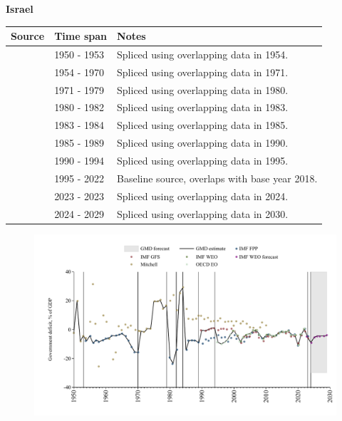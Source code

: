 \documentclass[12pt,a4paper,landscape]{article}
\begin{document}
\begin{adjustbox}{max totalsize={\paperwidth}{\paperheight},center}
\begin{minipage}[t][\textheight][t]{\textwidth}
\vspace*{0.5cm}
{}
\begin{center}
{\Large\bfseries Israel}
\end{center}
\vspace{0.5cm}
\begin{table}[H]
\centering
\small
\begin{tabular}{|l|l|l|}
\hline
\textbf{Source} & \textbf{Time span} & \textbf{Notes} \\
\hline
\rowcolor{white}\cite{Mitchell}& 1950 - 1953 &Spliced using overlapping data in 1954.\\
\rowcolor{lightgray}\cite{IMF_FPP}& 1954 - 1970 &Spliced using overlapping data in 1971.\\
\rowcolor{white}\cite{Mitchell}& 1971 - 1979 &Spliced using overlapping data in 1980.\\
\rowcolor{lightgray}\cite{IMF_FPP}& 1980 - 1982 &Spliced using overlapping data in 1983.\\
\rowcolor{white}\cite{Mitchell}& 1983 - 1984 &Spliced using overlapping data in 1985.\\
\rowcolor{lightgray}\cite{IMF_FPP}& 1985 - 1989 &Spliced using overlapping data in 1990.\\
\rowcolor{white}\cite{IMF_GFS}& 1990 - 1994 &Spliced using overlapping data in 1995.\\
\rowcolor{lightgray}\cite{OECD_EO}& 1995 - 2022 &Baseline source, overlaps with base year 2018.\\
\rowcolor{white}\cite{IMF_GFS}& 2023 - 2023 &Spliced using overlapping data in 2024.\\
\rowcolor{lightgray}\cite{IMF_WEO_forecast}& 2024 - 2029 &Spliced using overlapping data in 2030.\\
\hline
\end{tabular}
\end{table}
\begin{figure}[H]
\centering
\includegraphics[width=\textwidth,height=0.6\textheight,keepaspectratio]{graphs/ISR_govdef_GDP.pdf}
\end{figure}
\end{minipage}
\end{adjustbox}
\end{document}
